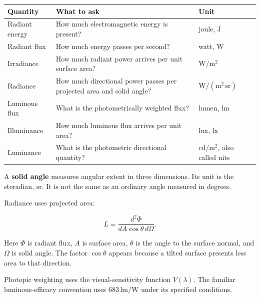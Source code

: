 {\def\LTcaptype{none} %
\begin{longtable}[]{@{}
  >{\raggedright\arraybackslash}p{}
  >{\raggedright\arraybackslash}p{}
  >{\raggedright\arraybackslash}p{}@{}}
\toprule\noalign{}
\begin{minipage}[b]{\linewidth}\raggedright
Quantity
\end{minipage} & \begin{minipage}[b]{\linewidth}\raggedright
What to ask
\end{minipage} & \begin{minipage}[b]{\linewidth}\raggedright
Unit
\end{minipage} \\
\midrule\noalign{}
\endhead
\bottomrule\noalign{}
\endlastfoot
Radiant energy & How much electromagnetic energy is present? & joule, \(\mathrm{J}\) \\
Radiant flux & How much energy passes per second? & watt, \(\mathrm{W}\) \\
Irradiance & How much radiant power arrives per unit surface area? & \(\mathrm{W/m^2}\) \\
Radiance & How much directional power passes per projected area and solid angle? & \(\mathrm{W/(m^2\,sr)}\) \\
Luminous flux & What is the photometrically weighted flux? & lumen, \(\mathrm{lm}\) \\
Illuminance & How much luminous flux arrives per unit area? & lux, \(\mathrm{lx}\) \\
Luminance & What is the photometric directional quantity? & \(\mathrm{cd/m^2}\), also called nits \\
\end{longtable}
}

A \textbf{solid angle} measures angular extent in three dimensions. Its unit is the steradian, \(\mathrm{sr}\). It is not the same as an ordinary angle measured in degrees.

Radiance uses projected area:

\[
L=\frac{d^2\Phi}{dA\cos\theta\,d\Omega}.
\]

Here \(\Phi\) is radiant flux, \(A\) is surface area, \(\theta\) is the angle to the surface normal, and \(\Omega\) is solid angle. The factor \(\cos\theta\) appears because a tilted surface presents less area to that direction.

Photopic weighting uses the visual-sensitivity function \(V(\lambda)\). The familiar luminous-efficacy convention uses \(683\,\mathrm{lm/W}\) under its specified conditions.

